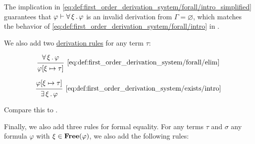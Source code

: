 \begin{definition}
\begin{thmenum}
    The implication in \eqref{eq:def:first_order_derivation_system/forall/intro_simplified} guarantees that \( \varphi \vdash \forall \thinspace \xi \thinspace . \thinspace \varphi \) is an invalid derivation from \( \Gamma = \varnothing \), which matches the behavior of \ref{eq:def:first_order_derivation_system/forall/intro} in .

     We also add two \hyperref[def:proof_derivation_system/rules]{derivation rules} for any term \( \tau \):

    \begin{minipage}{0.45\textwidth}
      \begin{equation*}\taglabel[\textrm{R} \( \forall^- \)]{eq:def:first_order_derivation_system/forall/elim}
        \begin{prooftree}
          \hypo{ \qforall \xi \varphi }
          \infer1[\ref{eq:def:first_order_derivation_system/forall/elim}]{ \varphi[\xi \mapsto \tau] }
        \end{prooftree}
      \end{equation*}
    \end{minipage}
    \hfill
    \begin{minipage}{0.45\textwidth}
      \begin{equation*}\taglabel[\textrm{R} \( \exists^+ \)]{eq:def:first_order_derivation_system/exists/intro}
        \begin{prooftree}
          \hypo{ \varphi[\xi \mapsto \tau] }
          \infer1[\ref{eq:def:first_order_derivation_system/exists/intro}]{ \qexists \xi \varphi }
        \end{prooftree}
      \end{equation*}
    \end{minipage}

    Compare this to .

     Finally, we also add three rules for formal equality. For any terms \( \tau \) and \( \sigma \) any formula \( \varphi \) with \( \xi \in \operatorname{\mathbf{Free}}(\varphi) \), we also add the following rules:


\end{thmenum}
\end{definition}
